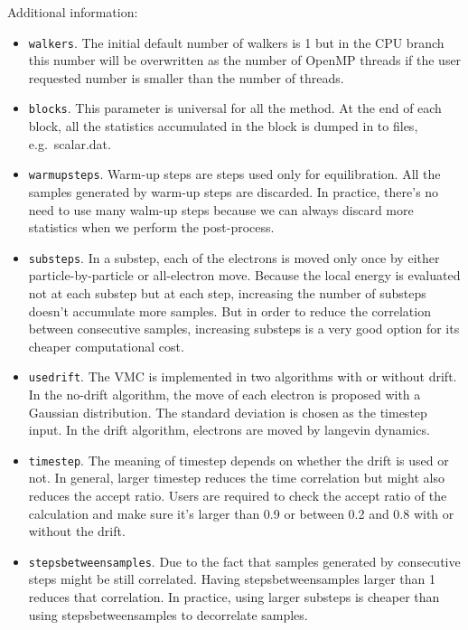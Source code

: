 Additional information:
\begin{itemize}
\item \texttt{walkers}. The initial default number of walkers is 1 but in the CPU branch this number will be overwritten as the number of OpenMP threads if the user requested number is smaller than the number of threads.

\item \texttt{blocks}. This parameter is universal for all the method. At the end of each block, all the statistics accumulated in the block is dumped in to files, e.g.\ scalar.dat.

\item \texttt{warmupsteps}. Warm-up steps are steps used only for equilibration. All the samples generated by warm-up steps are discarded. In practice, there's no need to use many walm-up steps because we can always discard more statistics when we perform the post-process.

\item \texttt{substeps}. In a substep, each of the electrons is moved only once by either particle-by-particle or all-electron move.
Because the local energy is evaluated not at each substep but at each step, increasing the number of substeps doesn't accumulate more samples. But in order to reduce the correlation between consecutive samples, increasing substeps is a very good option for its cheaper computational cost.

\item \texttt{usedrift}. The VMC is implemented in two algorithms with or without drift. In the no-drift algorithm, the move of each electron is proposed with a Gaussian distribution. The standard deviation is chosen as the timestep input. In the drift algorithm, electrons are moved by langevin dynamics.

\item \texttt{timestep}. The meaning of timestep depends on whether the drift is used or not. In general, larger timestep reduces the time correlation but might also reduces the accept ratio. Users are required to check the accept ratio of the calculation and make sure it's larger than 0.9 or between 0.2 and 0.8 with or without the drift.

\item \texttt{stepsbetweensamples}. Due to the fact that samples generated by consecutive steps might be still correlated. Having stepsbetweensamples larger than 1 reduces that correlation. In practice, using larger substeps is cheaper than using stepsbetweensamples to decorrelate samples.


\end{itemize}
